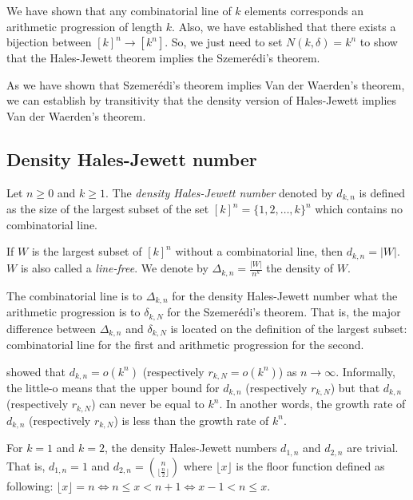 We have shown that any combinatorial line of $k$ elements corresponds an arithmetic progression of length $k.$ Also, we have established that there exists a bijection between $[k]^n \longrightarrow [k^n].$ So, we just need to set $N(k,\delta)=k^n$ to show that the Hales-Jewett theorem implies the Szemerédi's theorem.

As we have shown that Szemerédi's theorem implies Van der Waerden's theorem, we can establish by transitivity that the density version of Hales-Jewett implies Van der Waerden's theorem.


\subsection{Density Hales-Jewett number}

\begin{defn} Let $n \geq 0$ and $k \geq 1.$ The \textit{density Hales-Jewett number}	denoted by $d_{k,n}$ is defined as the size of the largest subset of the set $[k]^n=\{1,2, \ldots, k\}^n$ which contains no combinatorial	line. \end{defn}
If $W$ is the largest subset of $[k]^n$ without a combinatorial line, then $d_{k,n}=|W|.$ $W$ is also called a \textit{line-free}. We denote by $\Delta_{k,n}=\frac{|W|}{n^k}$ the density of $W.$

The combinatorial line is to $\Delta_{k,n}$ for the density Hales-Jewett number what the arithmetic progression is to $\delta_{k,N}$ for the Szemerédi's theorem. That is, the major  difference between $\Delta_{k,n}$ and $\delta_{k,N}$ is located on the definition of the largest subset: combinatorial line for the first and arithmetic progression for the second. 

\cite*{furstenberg1991density} showed that $d_{k,n}=o(k^n)$ (respectively $r_{k,N}=o(k^n)$) as $n\longrightarrow \infty.$ Informally, the little-o means that the upper bound for $d_{k,n}$ (respectively $r_{k,N}$) but that $d_{k,n}$ (respectively $r_{k,N}$) can never be equal to $k^n.$ In another words, the growth rate of $d_{k,n}$ (respectively $r_{k,N}$) is less than the growth rate of $k^n.$

For $k=1$ and $k=2$, the density Hales-Jewett numbers $d_{1,n}$ and $d_{2,n}$ are trivial. That is, $d_{1,n}=1$ and $d_{2,n}= {n \choose \lfloor \frac{n}{2} \rfloor}$ where $\lfloor x \rfloor $ is the floor function defined as following: $\lfloor x \rfloor =n \Longleftrightarrow n \leq x < n+1 \Longleftrightarrow  x-1 < n \leq x .$

